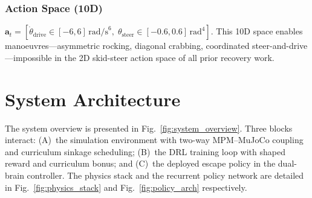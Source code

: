 \documentclass[conference]{IEEEtran}
\begin{document}
\subsubsection{Action Space (10D)}

$\mathbf{a}_t = [\dot{\theta}_{\text{drive}} \in [-6,6]\,\text{rad/s}^6,\;
\theta_{\text{steer}} \in [-0.6,0.6]\,\text{rad}^4]$. This 10D space enables manoeuvres---asymmetric rocking, diagonal crabbing,
coordinated steer-and-drive---impossible in the 2D skid-steer action space of
all prior recovery work.

\section{System Architecture}
\label{sec:architecture}

The system overview is presented in Fig.~\ref{fig:system_overview}. Three blocks
interact: (A)~the simulation environment with two-way MPM--MuJoCo coupling and
curriculum sinkage scheduling; (B)~the DRL training loop with shaped reward and
curriculum bonus; and (C)~the deployed escape policy in the dual-brain controller.
The physics stack and the recurrent policy network are detailed in
Fig.~\ref{fig:physics_stack} and Fig.~\ref{fig:policy_arch} respectively.
\end{document}
